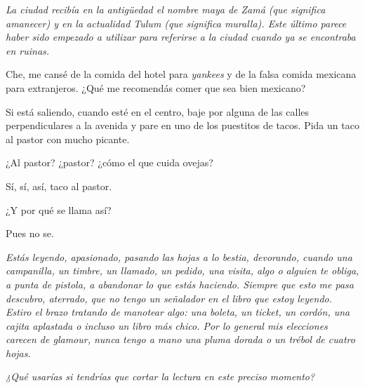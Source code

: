 \documentclass[12pt,twoside,openright,a5paper]{book}
\begin{document}
\hrulefill\hspace{0.2cm} \decofourleft\decofourright \hspace{0.2cm} \hrulefill
\vspace{0.5cm}

\emph{La ciudad recibía en la
antigüedad el nombre maya de Zamá (que significa amanecer) y
en la actualidad Tulum
(que significa muralla). Este último parece haber sido
empezado a utilizar para referirse a la ciudad cuando
ya se encontraba en ruinas.}

\vspace{0.5cm}

\hrulefill\hspace{0.2cm} \decofourleft\decofourright \hspace{0.2cm} \hrulefill
\vspace{0.5cm}

Che, me cansé de la comida del hotel para \emph{yankees} y de la falsa comida
mexicana para extranjeros. ¿Qué me recomendás comer que sea bien mexicano?

Si está saliendo, cuando esté en el centro, baje por alguna de las calles
perpendiculares a la avenida y pare en uno de los puestitos de tacos. Pida
un taco al pastor con mucho picante.

¿Al pastor? ¿pastor? ¿cómo el que cuida ovejas?

Sí, sí, así, taco al pastor.

¿Y por qué se llama así?

Pues no se.

\vspace{0.5cm}

\hrulefill\hspace{0.2cm} \decofourleft\decofourright \hspace{0.2cm} \hrulefill
\vspace{0.5cm}

\emph{Estás leyendo, apasionado, pasando las hojas a lo bestia, devorando, cuando
una campanilla, un timbre, un llamado, un pedido, una visita, algo o alguien
te obliga, a punta de pistola, a abandonar lo que estás haciendo. Siempre
que esto me pasa descubro, aterrado, que no tengo un señalador en el libro
que estoy leyendo. Estiro el brazo tratando de manotear algo: una boleta, un
ticket, un cordón, una cajita aplastada o incluso un libro más chico. Por
lo general mis elecciones carecen de glamour, nunca tengo a mano una pluma
dorada o un trébol de cuatro hojas.}

\emph{¿Qué usarías si tendrías que cortar la lectura en este preciso momento?}
\end{document}
